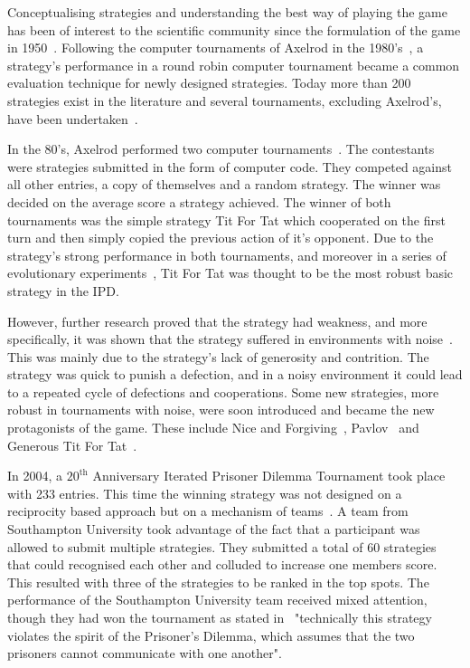 \documentclass{article}
\begin{document}
Conceptualising strategies and understanding the best way of playing the game
has been of interest to the scientific community since the formulation of the
game in 1950~\cite{Flood1958}. Following the computer tournaments of Axelrod in the
1980's~\cite{Axelrod1980a, Axelrod1980b}, a strategy's performance in a round
robin computer tournament became a common evaluation technique for newly designed
strategies. Today more than 200 strategies exist in the literature and several
tournaments, excluding Axelrod's, have been undertaken~\cite{Bendor1991,
Harper2017, Kendall2007, Stephens2002, Stewart2012}.

In the 80's, Axelrod performed two computer tournaments~\cite{Axelrod1980a,
Axelrod1980b}. The contestants were strategies submitted in the form of computer
code. They competed against all other entries, a copy of themselves and a random
strategy. The winner was decided on the average score a strategy achieved. The
winner of both tournaments was the simple strategy Tit For Tat which cooperated
on the first turn and then simply copied the previous action of it's opponent.
Due to the strategy's strong performance in both tournaments, and moreover in a
series of evolutionary experiments~\cite{Axelrod1981}, Tit For Tat was thought
to be the most robust basic strategy in the IPD.

However, further research proved that the strategy had weakness, and more
specifically, it was shown that the strategy suffered in environments with
noise~\cite{Bendor1991, Donninger1986, Molander1985, Hammerstein1984}. This was
mainly due to the strategy's lack of generosity and contrition. The strategy was
quick to punish a defection, and in a noisy environment it could lead to a
repeated cycle of defections and cooperations. Some new strategies, more
robust in tournaments with noise, were soon introduced and became the new
protagonists of the game. These include Nice and Forgiving~\cite{Bendor1991},
Pavlov~\cite{Nowak1993} and Generous Tit For Tat~\cite{Nowak1992}.

In 2004, a $20^{\text{th}}$ Anniversary Iterated Prisoner Dilemma Tournament
took place with 233 entries. This time the winning strategy was not designed on
a reciprocity based approach but on a mechanism of
teams~\cite{J.P.Delahaye1993Lp, J.P.Delahaye1995LIeP, A.Rogers2007Ctpw}. A team
from Southampton University took advantage of the fact that a participant was
allowed to submit multiple strategies. They submitted a total of 60 strategies
that could recognised each other and colluded to increase one members score.
This resulted with three of the strategies to be ranked in the top spots. The
performance of the Southampton University team received mixed attention, though
they had won the tournament as stated in~\cite{us_blog} "technically this
strategy violates the spirit of the Prisoner's Dilemma, which assumes that the
two prisoners cannot communicate with one another".
\end{document}
